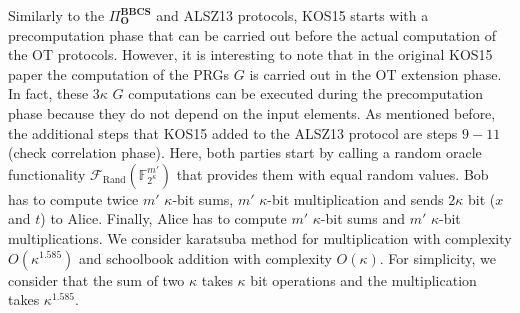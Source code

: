Similarly to the $\Pi^{\textbf{BBCS}}_{\textbf{O}}$ and ALSZ13 protocols, KOS15 starts with a precomputation phase that can be carried out before the actual computation of the OT protocols. However, it is interesting to note that in the original KOS15 paper \cite{KOS15} the computation of the PRGs $G$ is carried out in the OT extension phase. In fact, these $3\kappa$ $G$ computations can be executed during the precomputation phase because they do not depend on the input elements. As mentioned before, the additional steps that KOS15 added to the ALSZ13 protocol are steps $9-11$ (check correlation phase). Here, both parties start by calling a random oracle functionality $\mathcal{F}_{\text{Rand}}(\mathbb{F}^{m'}_{2^\kappa})$ that provides them with equal random values. Bob has to compute twice $m'$ $\kappa$-bit sums, $m'$ $\kappa$-bit multiplication and sends $2\kappa$ bit ($x$ and $t$) to Alice. Finally, Alice has to compute $m'$ $\kappa$-bit sums and $m'$ $\kappa$-bit multiplications. We consider karatsuba method for multiplication with complexity $O(\kappa^{1.585})$ and schoolbook addition with complexity $O(\kappa)$. For simplicity, we consider that the sum of two $\kappa$ takes $\kappa$ bit operations and the multiplication takes $\kappa^{1.585}$. 

